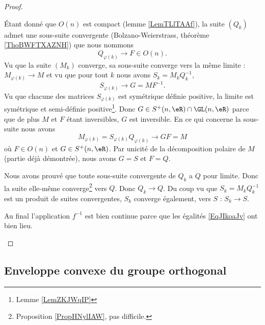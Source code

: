 \begin{proof}
\begin{subproof}
            Étant donné que \( O(n)\) est compact (lemme \ref{LemTLlTAAf}), la suite \( (Q_k)\) admet une sous-suite convergente (Bolzano-Weierstrass, théorème \ref{ThoBWFTXAZNH}) que nous nommons
            \begin{equation}
                Q_{\varphi(k)}\to F\in O(n).
            \end{equation}
            Vu que la suite \( (M_k)\) converge, sa sous-suite converge vers la même limite : \( M_{\varphi(k)}\to M\) et vu que pour tout \( k\) nous avons \( S_k=M_kQ_k^{-1}\),
            \begin{equation}
                S_{\varphi(k)}\to G=MF^{-1}.
            \end{equation}
            Vu que chacune des matrices \( S_{\varphi(k)}\) est symétrique définie positive, la limite est symétrique et semi-définie positive\footnote{Lemme \ref{LemZKJWqIP}}. Donc \( G\in S^+(n,\eR)\cap \GL(n,\eR)\) parce que de plus \( M\) et \( F\) étant inversibles, \( G\) est inversible. En ce qui concerne la sous-suite nous avons
            \begin{equation}
                M_{\varphi(k)}=S_{\varphi(k)}Q_{\varphi(k)}\to GF=M
            \end{equation}
            où \( F\in O(n)\) et \( G\in S^+(n,\eR)\). Par unicité de la décomposition polaire de \( M\) (partie déjà démontrée), nous avons \( G=S\) et \( F=Q\).

            Nous avons prouvé que toute sous-suite convergente de \( Q_k\) a \( Q\) pour limite. Donc la suite elle-même converge\footnote{Proposition \ref{PropHNylIAW}, pas difficile.} vers \( Q\). Donc \( Q_k\to Q\). Du coup vu que \( S_k=M_kQ_k^{-1}\) est un produit de suites convergentes, \( S_k\) converge également, vers \( S\) :  \( S_k\to S\).

            Au final l'application \( f^{-1}\) est bien continue parce que les égalités \eqref{EqJIkoaJv} ont bien lieu.

    \end{subproof}
\end{proof}

\subsection{Enveloppe convexe du groupe orthogonal}

